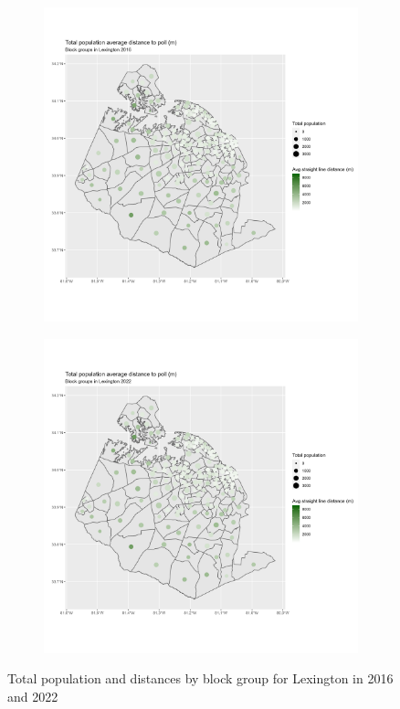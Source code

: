 \documentclass[11pt]{article}
\theoremstyle{remark}
\theoremstyle{definition}
\begin{document}
\begin{figure}
	\begin{subfigure}{.5\textwidth}
		\centering
		\includegraphics[width=\linewidth]{result_analysis/Lexington_SC_original_configs/population_pop_and_dist_Lexington_config_original_2016_polls.png}
		\label{sfig:York_2016_bg_dist_pop}
	\end{subfigure} 
	\begin{subfigure}{.5\textwidth}
		\centering
		\includegraphics[width=\linewidth]{result_analysis/Lexington_SC_original_configs/population_pop_and_dist_Lexington_config_original_2022_polls.png}
		\label{sfig:Lexington_2022_bg_dist}
	\end{subfigure}
	\caption{Total population and distances by block group for Lexington in 2016 and 2022}
	\label{fig:Lexington distance Total population maps}
\end{figure}
\end{document}

